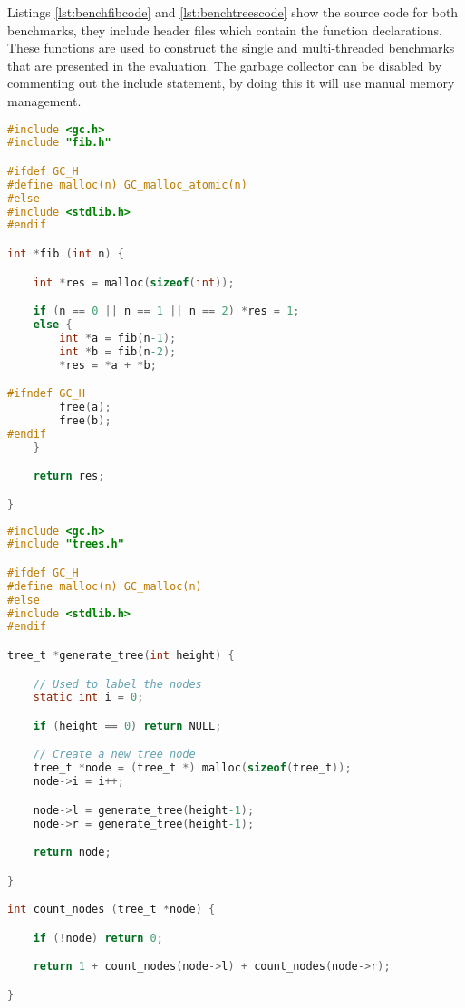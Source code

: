 \documentclass[12pt,a4paper,twoside,openright]{report}
\begin{document}
Listings \ref{lst:benchfibcode} and \ref{lst:benchtreescode} show the source code for both benchmarks, they include header files which contain the function declarations. These functions are used to construct the single and multi-threaded benchmarks that are presented in the evaluation. The garbage collector can be disabled by commenting out the include statement, by doing this it will use manual memory management.

\begin{figure*}
\begin{lstlisting}[language=C, caption=Fibonacci benchmark source code, label={lst:benchfibcode}]
#include <gc.h>
#include "fib.h"

#ifdef GC_H
#define malloc(n) GC_malloc_atomic(n)
#else
#include <stdlib.h>
#endif

int *fib (int n) {

    int *res = malloc(sizeof(int));

    if (n == 0 || n == 1 || n == 2) *res = 1;
    else {
        int *a = fib(n-1);
        int *b = fib(n-2);
        *res = *a + *b;

#ifndef GC_H
        free(a);
        free(b);
#endif
    }

    return res;

}
\end{lstlisting}
\end{figure*}

\begin{figure*}
\begin{lstlisting}[language=C, caption=Trees benchmark source code, label={lst:benchtreescode}]
#include <gc.h>
#include "trees.h"

#ifdef GC_H
#define malloc(n) GC_malloc(n)
#else
#include <stdlib.h>
#endif

tree_t *generate_tree(int height) {

    // Used to label the nodes
    static int i = 0;

    if (height == 0) return NULL;

    // Create a new tree node
    tree_t *node = (tree_t *) malloc(sizeof(tree_t));
    node->i = i++;

    node->l = generate_tree(height-1);
    node->r = generate_tree(height-1);

    return node;

}

int count_nodes (tree_t *node) {

    if (!node) return 0;

    return 1 + count_nodes(node->l) + count_nodes(node->r);

}
\end{lstlisting}
\end{figure*}
\end{document}
